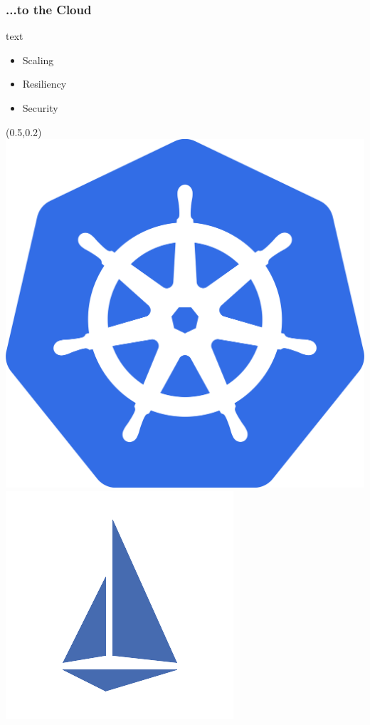 \documentclass[aspectratio=169,11pt,hyperref={colorlinks=true}]{beamer}
\begin{document}
\begin{lblackrwhiteframe}
  \frametitle{...to the Cloud}
  \large
  \begin{beamercolorbox}[wd=0.3\paperwidth]{text}
    \begin{itemize}
      \item Scaling
      \item Resiliency
      \item Security
    \end{itemize}
  \end{beamercolorbox}%
  \begin{textblock*}{0.5\paperwidth}(0.5\paperwidth,0.2\paperheight)
    \centering
    \includegraphics[width=0.20\paperwidth]{img/kubernetes.png}
    \includegraphics[width=0.20\paperwidth]{img/istio.png}

\end{textblock*}
\end{lblackrwhiteframe}
\end{document}
